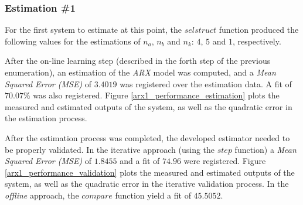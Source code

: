 \documentclass[12pt]{article}
\begin{document}
\subsubsection{Estimation \#1}
\label{estimation1}

For the first system to estimate at this point, the $selstruct$ function produced the following values for the estimations of $n_{a}$, $n_{b}$ and $n_{k}$: $4$, $5$ and $1$, respectively.

After the on-line learning step (described in the forth step of the previous enumeration), an estimation of the \emph{ARX} model was computed, and a \emph{Mean Squared Error (MSE)} of $3.4019$ was registered over the estimation data. A fit of $70.07\%$ was also registered. Figure \ref{arx1_performance_estimation} plots the measured and estimated outputs of the system, as well as the quadratic error in the estimation process.

After the estimation process was completed, the developed estimator needed to be properly validated. In the iterative approach (using the $step$ function) a \emph{Mean Squared Error (MSE)} of $1.8455$ and a fit of $74.96$ were registered. Figure \ref{arx1_performance_validation} plots the measured and estimated outputs of the system, as well as the quadratic error in the iterative validation process. In the \emph{offline} approach, the $compare$ function yield a fit of $45.5052$.
\end{document}
